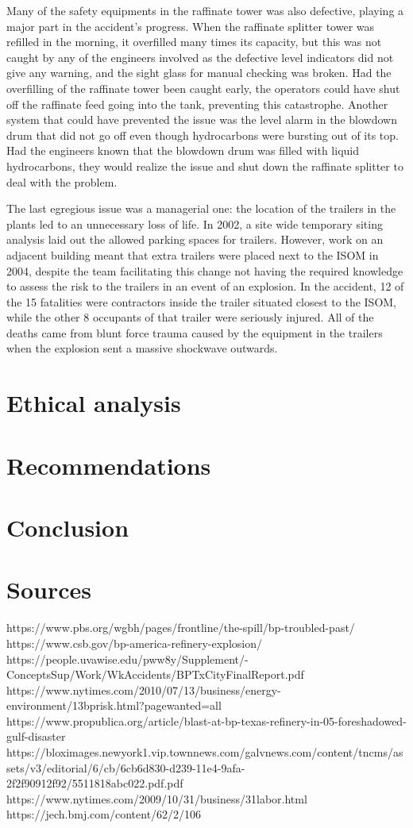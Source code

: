 \documentclass[12pt]{article}
\begin{document}
	  Many of the safety equipments in the raffinate tower was also defective, playing a major part in the accident's progress. When the raffinate splitter tower was refilled in the morning, it overfilled many times its capacity, but this was not caught by any of the engineers involved as the defective level indicators did not give any warning, and the sight glass for manual checking was broken. Had the overfilling of the raffinate tower been caught early, the operators could have shut off the raffinate feed going into the tank, preventing this catastrophe. Another system that could have prevented the issue was the level alarm in the blowdown drum that did not go off even though hydrocarbons were bursting out of its top. Had the engineers known that the blowdown drum was filled with liquid hydrocarbons, they would realize the issue and shut down the raffinate splitter to deal with the problem.
	  
	  The last egregious issue was a managerial one: the location of the trailers in the plants led to an unnecessary loss of life. In 2002, a site wide temporary siting analysis laid out the allowed parking spaces for trailers. However, work on an adjacent building meant that extra trailers were placed next to the ISOM in 2004, despite the team facilitating this change not having the required knowledge to assess the risk to the trailers in an event of an explosion. In the accident, 12 of the 15 fatalities were contractors inside the trailer situated closest to the ISOM, while the other 8 occupants of that trailer were seriously injured. All of the deaths came from blunt force trauma caused by the equipment in the trailers when the explosion sent a massive shockwave outwards.
	
	
	\section*{Ethical analysis}
	\section*{Recommendations}
	\section*{Conclusion}
	\section*{Sources}
	https://www.pbs.org/wgbh/pages/frontline/the-spill/bp-troubled-past/
	https://www.csb.gov/bp-america-refinery-explosion/
	https://people.uvawise.edu/pww8y/Supplement/-ConceptsSup/Work/WkAccidents/BPTxCityFinalReport.pdf
	https://www.nytimes.com/2010/07/13/business/energy-environment/13bprisk.html?pagewanted=all
	https://www.propublica.org/article/blast-at-bp-texas-refinery-in-05-foreshadowed-gulf-disaster
	https://bloximages.newyork1.vip.townnews.com/galvnews.com/content/tncms/assets/v3/editorial/6/cb/6cb6d830-d239-11e4-9afa-2f2f90912f92/5511818abc022.pdf.pdf
	https://www.nytimes.com/2009/10/31/business/31labor.html
	https://jech.bmj.com/content/62/2/106
\end{document}

